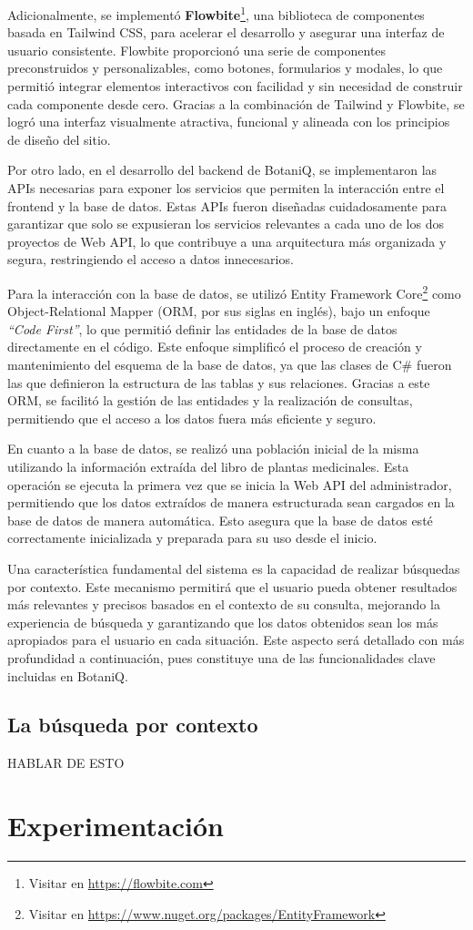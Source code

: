 Adicionalmente, se implementó 
\textbf{Flowbite}\footnote{Visitar en \url{https://flowbite.com}},
una biblioteca de componentes basada en Tailwind CSS, para acelerar el desarrollo y asegurar una interfaz de 
usuario consistente. Flowbite proporcionó una serie de componentes preconstruidos y personalizables, como 
botones, formularios y modales, lo que permitió integrar elementos interactivos con facilidad y sin necesidad 
de construir cada componente desde cero. Gracias a la combinación de Tailwind y Flowbite, se logró una 
interfaz visualmente atractiva, funcional y alineada con los principios de diseño del sitio.

Por otro lado, en el desarrollo del backend de BotaniQ, se implementaron las APIs necesarias para exponer 
los servicios que permiten la interacción entre el frontend y la base de datos. Estas APIs fueron diseñadas 
cuidadosamente para garantizar que solo se expusieran los servicios relevantes a cada uno de los dos proyectos 
de Web API, lo que contribuye a una arquitectura más organizada y segura, restringiendo el acceso a datos innecesarios.

Para la interacción con la base de datos, se utilizó 
Entity Framework Core\footnote{Visitar en \url{https://www.nuget.org/packages/EntityFramework}} 
como Object-Relational Mapper (ORM, por sus siglas en inglés),
bajo un enfoque \textit{``Code First''}, lo que permitió definir las entidades de la base de datos directamente 
en el código. Este enfoque simplificó el proceso de creación y mantenimiento del esquema de la base de datos, 
ya que las clases de C\# fueron las que definieron la estructura de las tablas y sus relaciones. Gracias a este ORM, 
se facilitó la gestión de las entidades y la realización de consultas, permitiendo que el acceso a los datos fuera 
más eficiente y seguro.

En cuanto a la base de datos, se realizó una población inicial de la misma utilizando la información extraída del 
libro de plantas medicinales. Esta operación se ejecuta la primera vez que se inicia la Web API del administrador, 
permitiendo que los datos extraídos de manera estructurada sean cargados en la base de datos de manera automática. 
Esto asegura que la base de datos esté correctamente inicializada y preparada para su uso desde el inicio.

Una característica fundamental del sistema es la capacidad de realizar búsquedas por contexto. Este mecanismo permitirá 
que el usuario pueda obtener resultados más relevantes y precisos basados en el contexto de su consulta, mejorando 
la experiencia de búsqueda y garantizando que los datos obtenidos sean los más apropiados para el usuario en cada situación. 
Este aspecto será detallado con más profundidad a continuación, pues constituye una de las funcionalidades clave incluidas en BotaniQ.


\subsection{La búsqueda por contexto}
HABLAR DE ESTO




\section{Experimentación}